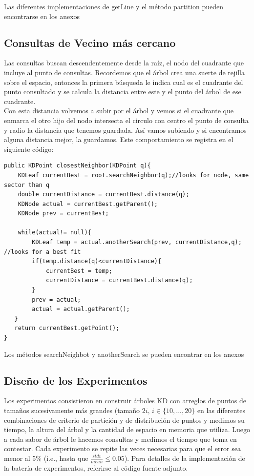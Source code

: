 \documentclass[12pt,letterpaper, margin = 3cm]{article}
\begin{document}
Las diferentes implementaciones de getLine y el método partition pueden encontrarse en los anexos

\subsection{Consultas de Vecino más cercano}

Las consultas buscan descendentemente desde la raíz, el nodo del cuadrante que incluye al punto de consultas. Recordemos que el árbol crea una suerte de rejilla sobre el espacio, entonces la primera búsqueda le indica cual es el cuadrante del punto consultado y se calcula la distancia entre este y el punto del árbol de ese cuadrante.\\
Con esta distancia volvemos a subir por el árbol y vemos si el cuadrante que enmarca el otro hijo del nodo intersecta el circulo con centro el punto de consulta y radio la distancia que tenemos guardada. Así vamos subiendo y si encontramos alguna distancia mejor, la guardamos. Este comportamiento se registra en el siguiente código:
\newpage
\begin{lstlisting}
public KDPoint closestNeighbor(KDPoint q){
    KDLeaf currentBest = root.searchNeighbor(q);//looks for node, same sector than q
    double currentDistance = currentBest.distance(q);
    KDNode actual = currentBest.getParent();
    KDNode prev = currentBest;  
    
    while(actual!= null){
        KDLeaf temp = actual.anotherSearch(prev, currentDistance,q); //looks for a best fit
        if(temp.distance(q)<currentDistance){
            currentBest = temp;
            currentDistance = currentBest.distance(q);
        }
        prev = actual;
        actual = actual.getParent();
   }
   return currentBest.getPoint();
}
\end{lstlisting}

Los métodos searchNeighbot y anotherSearch se pueden encontrar en los anexos
\newpage
\subsection{Diseño de los Experimentos}
Los experimentos consistieron en construir árboles KD con arreglos de puntos de tamaños sucesivamente más grandes (tamaño $2i$, $i\in\{10,...,20\}$ en las diferentes combinaciones de criterio de partición y de distribución de puntos y medimos su tiempo, la altura del árbol y la cantidad de espacio en memoria que utiliza. Luego a cada sabor de árbol le hacemos consultas y medimos el tiempo que toma en contestar. Cada experimento se repite las veces necesarias para que el error sea menor al 5\% (i.e., hasta que $\frac{stdv}{mean}\leq 0.05$). Para detalles de la implementación de la batería de experimentos, referirse al código fuente adjunto.
\end{document}
